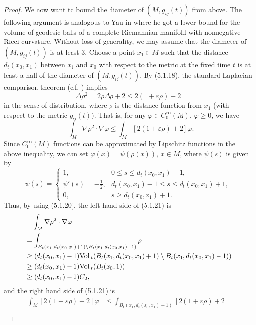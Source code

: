 \begin{proof}
We now want to bound the diameter of $(M,g_{ij}(t))$ from above.
The following argument is analogous to Yau in \cite{Y76} where he
got a lower bound for the volume of geodesic balls of a complete
Riemannian manifold with nonnegative Ricci curvature. Without loss
of generality, we may assume that the diameter of $(M,g_{ij}(t))$
is at least 3. Choose a point $x_1\in M$ such that the distance
$d_t(x_0,x_1)$ between $x_1$ and $x_0$ with respect to the metric
at the fixed time $t$ is at least a half of the diameter of
$(M,g_{ij}(t))$. By (5.1.18), the standard Laplacian comparison
theorem (c.f. \cite{ScY}) implies
$$
\Delta \rho^2=2\rho\Delta\rho+2\leq2(1+\varepsilon\rho)+2
$$
in the sense of distribution, where $\rho$ is the distance
function from $x_1$ (with respect to the metric $g_{ij}(t))$. That
is, for any $\varphi\in C_0^\infty(M)$, $\varphi\geq0$, we have
\begin{equation} -\int_M\nabla\rho^2\cdot\nabla\varphi
\leq\int_M[2(1+\varepsilon\rho)+2]\varphi. %
\end{equation} Since $C_0^\infty(M)$ functions can be approximated by
Lipschitz functions in the above inequality, we can set
$\varphi(x)=\psi(\rho(x))$, $x\in M$, where $\psi(s)$ is given by
$$
\psi(s)=\begin{cases}
1,& 0\leq s\leq d_t(x_0,x_1)-1,\\
\psi'(s)=-\frac{1}{2},& d_t(x_0,x_1)-1\leq s\leq
d_t(x_0,x_1)+1,\\
0,& s\geq d_t(x_0,x_1)+1.
\end{cases}
$$
Thus, by using (5.1.20), the left hand side of (5.1.21) is
\begin{displaymath}
\begin{split}
&-\int_M\nabla\rho^2\cdot\nabla\varphi \\
&  =\int_{B_t(x_1,d_t(x_0,x_1)+1)
\setminus B_t(x_1,d_t(x_0,x_1)-1)}\rho\\
&  \geq(d_t(x_0,x_1)-1){\rm Vol}\,_t(B_t(x_1,d_t(x_0,x_1)+1)
\setminus B_t(x_1,d_t(x_0,x_1)-1))\\
&  \geq(d_t(x_0,x_1)-1){\rm Vol}\,_t(B_t(x_0,1))\\
&  \geq(d_t(x_0,x_1)-1)C_2,
\end{split}
\end{displaymath}
 and the right hand side of (5.1.21) is
\begin{displaymath}
\begin{split}
\int_M[2(1+\varepsilon\rho)+2]\varphi
&  \leq\int_{B_t(x_1,d_t(x_0,x_1)+1)}[2(1+\varepsilon\rho)+2]\\

\end{split}
\end{displaymath}
\end{proof}

